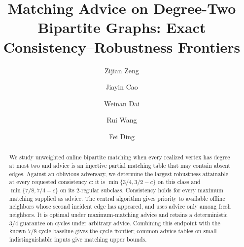 \documentclass[manuscript,11pt,screen,nonacm]{acmart}
\title{Matching Advice on Degree-Two Bipartite Graphs: Exact Consistency--Robustness Frontiers}
\author{Zijian Zeng}
\affiliation{\institution{UCSI University}\city{}\country{Malaysia}}
\author{Jiayin Cao}
\affiliation{\institution{Ningbo University}\city{}\country{China}}
\author{Weinan Dai}
\affiliation{\institution{Zhejiang University}\city{}\country{China}}
\author{Rui Wang}
\affiliation{\institution{Nanchang Institute of Technology}\city{}\country{China}}
\author{Fei Ding}
\affiliation{\institution{Alibaba Group}\city{}\country{China}}
\date{}
\begin{document}
\singlespacing
\begin{abstract}
\normalsize
We study unweighted online bipartite matching when every realized vertex has degree at most two and advice is an injective partial matching table that may contain absent edges. Against an oblivious adversary, we determine the largest robustness attainable at every requested consistency $c$: it is $\min\{3/4,3/2-c\}$ on this class and $\min\{7/8,7/4-c\}$ on its 2-regular subclass. Consistency holds for every maximum matching supplied as advice. The central algorithm gives priority to available offline neighbors whose second incident edge has appeared, and uses advice only among fresh neighbors. It is optimal under maximum-matching advice and retains a deterministic $3/4$ guarantee on cycles under arbitrary advice. Combining this endpoint with the known $7/8$ cycle baseline gives the cycle frontier; common advice tables on small indistinguishable inputs give matching upper bounds.
\end{abstract}
\hypersetup{pageanchor=false}
\maketitle
{}
\enlargethispage{-12pt}
\thispagestyle{empty}
\clearpage
\setcounter{page}{1}
\hypersetup{pageanchor=true}
\pagestyle{submission}



\clearpage
\onehalfspacing
\end{document}
